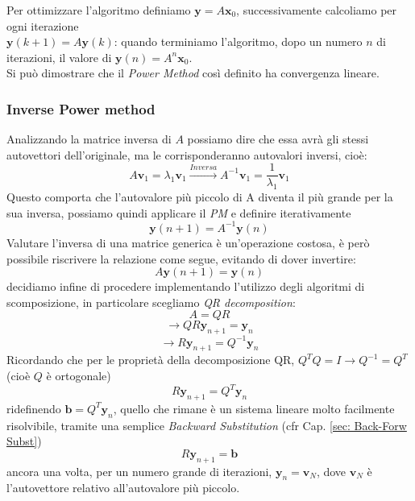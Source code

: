 \noindent Per ottimizzare l'algoritmo definiamo $\boldsymbol y = A\boldsymbol x_0$, successivamente calcoliamo per ogni iterazione\\ $\boldsymbol y(k+1) = A\boldsymbol y(k)$: quando terminiamo l'algoritmo, dopo un numero $n$ di iterazioni, il valore di $\boldsymbol y(n) = A^n \boldsymbol x_0$.\\

\noindent Si può dimostrare che il \textit{Power Method} così definito ha convergenza lineare.

\subsubsection{Inverse Power method} \label{sec: Inverse Pow mth}
Analizzando la matrice inversa di $A$ possiamo dire che essa avrà gli stessi autovettori dell'originale, ma le corrisponderanno autovalori inversi, cioè:
\[
A\boldsymbol v_1 =\lambda_1 \boldsymbol v_1 \xrightarrow{Inversa} A^{-1}\boldsymbol v_1 = \frac{1}{\lambda_1} \boldsymbol v_1
\]
Questo comporta che l'autovalore più piccolo di A diventa il più grande per la sua inversa, possiamo quindi applicare il \textit{PM} e definire iterativamente
\[
\boldsymbol	y(n+1) = A^{-1}\boldsymbol y(n)
\]
Valutare l'inversa di una matrice generica è un'operazione costosa, è però possibile riscrivere la relazione come segue, evitando di dover invertire:
\[
A\boldsymbol y(n+1) = \boldsymbol y(n)
\]
decidiamo infine di procedere implementando l'utilizzo degli algoritmi di scomposizione, in particolare scegliamo \textit{QR decomposition}: 
\[
A = QR 
\]
\[
\longrightarrow{} QR\boldsymbol y_{n+1} = \boldsymbol y_n
\]
\[
\longrightarrow{}R\boldsymbol y_{n+1} = Q^{-1} \boldsymbol y_n
\]
Ricordando che per le proprietà della decomposizione QR, $Q^TQ = I \longrightarrow{}Q^{-1} = Q^T$ (cioè $Q$ è ortogonale)
\[
R\boldsymbol y_{n+1} = Q^T \boldsymbol y_n
\]
ridefinendo $\boldsymbol{b} = Q^T \boldsymbol y_n$, quello che rimane è un sistema lineare molto facilmente risolvibile, tramite una semplice \textit{Backward Substitution} (cfr Cap. \ref{sec: Back-Forw Subst})
\[
R\boldsymbol y_{n+1} = \boldsymbol{b}
\]
ancora una volta, per un numero grande di iterazioni, $\boldsymbol y_n = \boldsymbol v_N$, dove $\boldsymbol v_N$ è l'autovettore relativo all'autovalore più piccolo.
